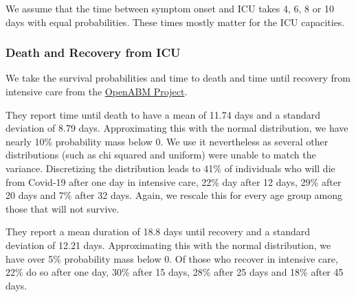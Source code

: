 We assume that the time between symptom onset and ICU takes 4, 6, 8 or 10 days with
equal probabilities. These times mostly matter for the ICU capacities.


\subsubsection{Death and Recovery from ICU}

We take the survival probabilities and time to death and time until recovery from
intensive care from the \href{https://tinyurl.com/y5owhyts}{OpenABM Project}.

They report time until death to have a mean of 11.74 days and a standard deviation of
8.79 days. Approximating this with the normal distribution, we have nearly 10\%
probability mass below 0. We use it nevertheless as several other distributions (such as
chi squared and uniform) were unable to match the variance. Discretizing the
distribution leads to 41\% of individuals who will die from Covid-19 after one day in
intensive care, 22\% day after 12 days, 29\% after 20 days and 7\% after 32 days. Again,
we rescale this for every age group among those that will not survive.

They report a mean duration of 18.8 days until recovery and a standard deviation of
12.21 days. Approximating this with the normal distribution, we have over 5\%
probability mass below 0. Of those who recover in intensive care, 22\% do so
after one day, 30\% after 15 days, 28\% after 25 days and 18\% after 45 days.
